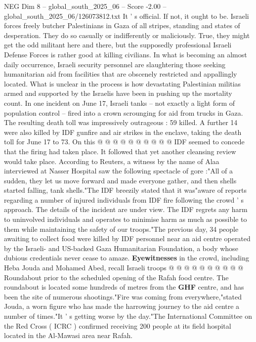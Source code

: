 \begin{textsample}{NEG Dim 8 – global\_south\_2025\_06 – Score -2.00 – global\_south\_2025\_06/126073812.txt}  \label{ex:f8_neg_040}
It ' s official.
If not, it ought to be.
Israeli forces freely butcher Palestinians in Gaza of all stripes, standing and states of desperation.
They do so casually or indifferently or maliciously.
True, they might get the odd militant here and there, but the supposedly professional Israeli Defense Forces is rather good at killing civilians.
In what is becoming an almost daily occurrence, Israeli security personnel are slaughtering those seeking humanitarian aid from facilities that are obscenely restricted and appallingly located.
What is unclear in the process is how devastating Palestinian militias armed and supported by the Israelis have been in pushing up the mortality count.
In one incident on June 17, Israeli tanks -- not exactly a light form of population control -- fired into a crown scrounging for aid from trucks in Gaza.
The resulting death toll was impressively outrageous : 59 killed.
A further 14 were also killed by IDF gunfire and air strikes in the enclave, taking the death toll for June 17 to 73.
On this @ @ @ @ @ @ @ @ @ @ IDF seemed to concede that the firing had taken place.
It followed that yet another cleansing review would take place.
According to Reuters, a witness by the name of Alaa interviewed at Nasser Hospital saw the following spectacle of gore :"All of a sudden, they let us move forward and made everyone gather, and then shells started falling, tank shells."The IDF breezily stated that it was"aware of reports regarding a number of injured individuals from IDF fire following the crowd ' s approach.
The details of the incident are under view.
The IDF regrets any harm to uninvolved individuals and operates to minimise harm as much as possible to them while maintaining the safety of our troops."The previous day, 34 people awaiting to collect food were killed by IDF personnel near an aid centre operated by the Israeli- and US-backed Gaza Humanitarian Foundation, a body whose dubious credentials never cease to amaze. \textbf{Eyewitnesses} in the crowd, including Heba Jouda and Mohamed Abed, recall Israeli troops @ @ @ @ @ @ @ @ @ @ Roundabout prior to the scheduled opening of the Rafah food centre.
The roundabout is located some hundreds of metres from the \textbf{GHF} centre, and has been the site of numerous shootings."Fire was coming from everywhere,"stated Jouda, a worn figure who has made the harrowing journey to the aid centre a number of times."It ' s getting worse by the day."The International Committee on the Red Cross ( ICRC ) confirmed receiving 200 people at its field hospital located in the Al-Mawasi area near Rafah.

\end{textsample}
